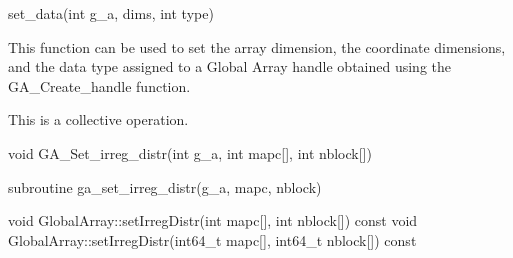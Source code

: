 \documentclass[12pt]{article}
\begin{document}
\begin{pyapi}
\begin{pycode}
set_data(int g_a, dims, int type)
\end{pycode}
\end{pyapi}

\begin{desc}

  This function can be used to set the array dimension, the coordinate
  dimensions, and the data type assigned to a Global Array handle
  obtained using the GA_Create_handle function.

  This is a collective operation.
\end{desc}



\begin{capi}
\begin{ccode}
void GA_Set_irreg_distr(int g_a, int mapc[], int nblock[])
\end{ccode}
\begin{funcargs}
\end{funcargs}
\end{capi}

\begin{fapi}
\begin{fcode}
subroutine ga_set_irreg_distr(g_a, mapc, nblock)
\end{fcode}
\begin{funcargs}
\end{funcargs}
\end{fapi}

\begin{cxxapi}
\begin{cxxcode}
void GlobalArray::setIrregDistr(int mapc[], int nblock[]) const
void GlobalArray::setIrregDistr(int64_t mapc[], int64_t nblock[]) const
\end{cxxcode}
\begin{funcargs}
\end{funcargs}
\end{cxxapi}
\end{document}

